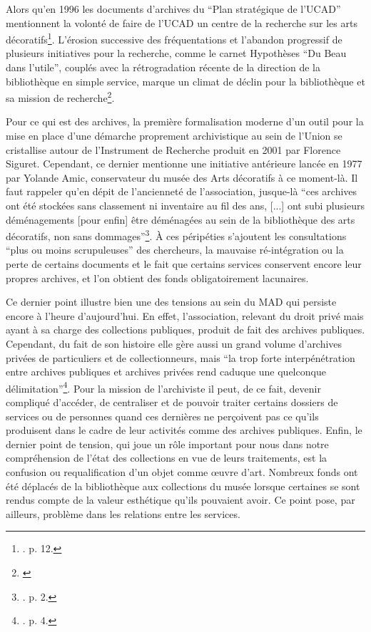 Alors qu'en 1996 les documents d'archives du \enquote{Plan stratégique de l'UCAD} mentionnent la volonté de faire de l'UCAD un centre de la recherche sur les arts décoratifs\footnote{\cite{noauthor__1996}. p. 12.}. L'érosion successive des fréquentations et l'abandon progressif de plusieurs initiatives pour la recherche, comme le carnet Hypothèses \enquote{Du Beau dans l'utile}, couplés avec la rétrogradation récente de la direction de la bibliothèque en simple service, marque un climat de déclin pour la bibliothèque et sa mission de recherche\footnote{\cite{rivoire_du_2021}}. 

Pour ce qui est des archives, la première formalisation moderne d'un outil pour la mise en place d'une démarche proprement archivistique au sein de l'Union se cristallise autour de l'Instrument de Recherche produit en 2001 par Florence Siguret. Cependant, ce dernier mentionne une initiative antérieure lancée en 1977 par Yolande Amic, conservateur du musée des Arts décoratifs à ce moment-là. Il faut rappeler qu'en dépit de l'ancienneté de l'association, jusque-là \enquote{ces archives ont été stockées sans classement ni inventaire au fil des ans, [...] ont subi plusieurs déménagements [pour enfin] être déménagées au sein de la bibliothèque des arts décoratifs, non sans dommages}\footnote{\cite{siguret_ir_2001}. p. 2.}. À ces péripéties s'ajoutent les consultations \enquote{plus ou moins scrupuleuses} des chercheurs, la mauvaise ré-intégration ou la perte de certains documents et le fait que certains services conservent encore leur propres archives, et l'on obtient des fonds obligatoirement lacunaires. 

Ce dernier point illustre bien une des tensions au sein du MAD qui persiste encore à l'heure d'aujourd'hui. En effet, l'association, relevant du droit privé mais ayant à sa charge des collections publiques, produit de fait des archives publiques. Cependant, du fait de son histoire elle gère aussi un grand volume d'archives privées de particuliers et de collectionneurs, mais \enquote{la trop forte interpénétration entre archives publiques et archives privées rend caduque une quelconque délimitation}\footnote{\cite{siguret_ir_2001}. p. 4.}. Pour la mission de l'archiviste il peut, de ce fait, devenir compliqué d'accéder, de centraliser et de pouvoir traiter certains dossiers de services ou de personnes quand ces dernières ne perçoivent pas ce qu'ils produisent dans le cadre de leur activités comme des archives publiques. Enfin, le dernier point de tension, qui joue un rôle important pour nous dans notre compréhension de l'état des collections en vue de leurs traitements, est la confusion ou requalification d'un objet comme œuvre d'art. Nombreux fonds ont été déplacés de la bibliothèque aux collections du musée lorsque certain\wokisme e\wokisme s se sont rendus compte de la valeur esthétique qu'ils pouvaient avoir. Ce point pose, par ailleurs, problème dans les relations entre les services. 


